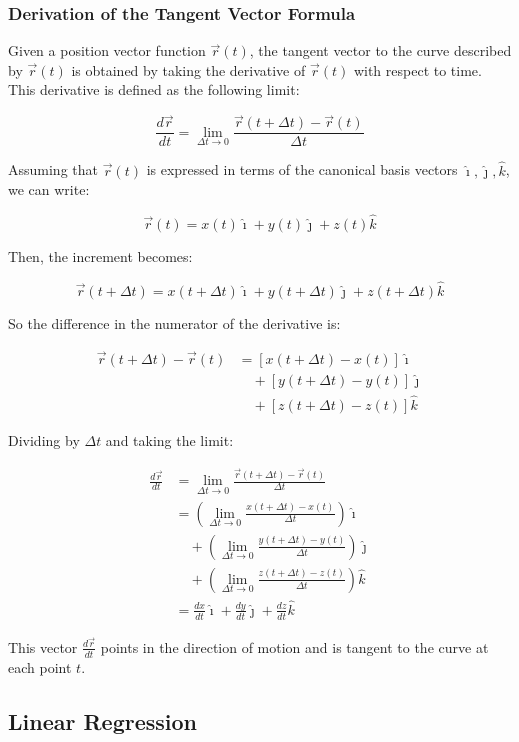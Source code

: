 \subsubsection{Derivation of the Tangent Vector Formula}

Given a position vector function \(\vec{r}(t)\), the tangent vector to the curve described by 
\(\vec{r}(t)\) is obtained by taking the derivative of \(\vec{r}(t)\) with respect to time. This 
derivative is defined as the following limit:

\[
    \frac{d\vec{r}}{dt} = \lim_{\Delta t \to 0} \frac{\vec{r}(t + \Delta t) - \vec{r}(t)}{\Delta t}
\]

Assuming that \(\vec{r}(t)\) is expressed in terms of the canonical basis vectors \(\hat{\imath}, 
\hat{\jmath}, \hat{k}\), we can write:

\[
    \vec{r}(t) = x(t)\hat{\imath} + y(t)\hat{\jmath} + z(t)\hat{k}
\]

Then, the increment becomes:

\[
    \vec{r}(t + \Delta t) = x(t + \Delta t)\hat{\imath} + y(t + \Delta t)\hat{\jmath} + z(t + \Delta t)
    \hat{k}
\]

So the difference in the numerator of the derivative is:

\begin{align*}
    \vec{r}(t + \Delta t) - \vec{r}(t) &= \left[x(t + \Delta t) - x(t)\right]\hat{\imath} \\
    &\quad + \left[y(t + \Delta t) - y(t)\right]\hat{\jmath} \\
    &\quad + \left[z(t + \Delta t) - z(t)\right]\hat{k}
\end{align*}

Dividing by \(\Delta t\) and taking the limit:

\begin{align*}
    \frac{d\vec{r}}{dt} &= \lim_{\Delta t \to 0} \frac{\vec{r}(t + \Delta t) - \vec{r}(t)}{\Delta t} \\
    &= \left( \lim_{\Delta t \to 0} \frac{x(t + \Delta t) - x(t)}{\Delta t} \right) \hat{\imath} \\
    &\quad + \left( \lim_{\Delta t \to 0} \frac{y(t + \Delta t) - y(t)}{\Delta t} \right) \hat{\jmath} \\
    &\quad + \left( \lim_{\Delta t \to 0} \frac{z(t + \Delta t) - z(t)}{\Delta t} \right) \hat{k} \\
    &= \frac{dx}{dt} \hat{\imath} + \frac{dy}{dt} \hat{\jmath} + \frac{dz}{dt} \hat{k}
\end{align*}

This vector \(\frac{d\vec{r}}{dt}\) points in the direction of motion and is tangent to the curve at 
each point \(t\).

\subsection{Linear Regression}




